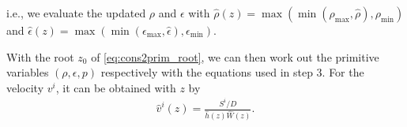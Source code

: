 \begin{Step}
    i.e., we evaluate the updated $\rho$ and $\epsilon$ with 
    $\hat{\rho}(z) = \max\left(\min\left(\rho_\max{},\hat{\rho}\right),\rho_\min{}\right)$ and
    $\hat{\epsilon}(z) = \max\left(\min\left(\epsilon_\max{},\hat{\epsilon}\right),\epsilon_\min{}\right)$.
    \item With the root $z_0$ of \cref{eq:cons2prim_root},
    we can then work out the primitive variables $\left(\rho, \epsilon, p\right)$ respectively with the equations used in step 3.
    For the velocity $v^i$, it can be obtained with $z$ by
    \begin{align}
        \hat{v}^i(z) = \frac{S^i/D}{\hat{h}(z)\hat{W}(z)}.
    \end{align}
\end{Step}

